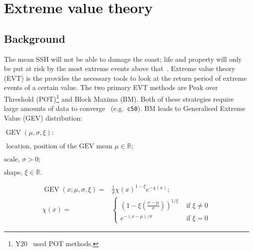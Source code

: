 \newpage
\newpage
[.]
\pagebreak

\section{Extreme value theory}
\label{sec:evt}
\subsection{Background}
The mean SSH will
not be able to damage the coast; life and property will only be put
at risk by the most extreme events above that~\cite{taleb2019statistical, Taleb2012AntifragileH}.
Extreme value theory (EVT) is the provides the necessary tools
to look at the return period of extreme events of a certain value.
The two primary EVT methods are Peak over Threshold
(POT)\footnote{Y20~\cite{ZannaPreprint} used POT methods. } and Block Maxima (BM).
Both of these strategies require
large amounts of data to converge~\cite{taleb2019much} (e.g.~\texttt{c50}).
BM leads to Generalised Extreme Value (GEV) distribution:


    \(
    \operatorname{GEV}(\mu, \sigma, \xi):
    \)

    \(
    \text{ location, position of the GEV mean } \mu \in \mathbb{R};
    \)

    \(
    \text{scale, } \sigma>0;
    \)

    \(
    \text{shape, } \xi \in \mathbb{R}.
    \)

    \iffalse
    \begin{align}
        \chi(x)=&\{
               \begin{array}{ll}
                    \left(1- \xi\left(\frac{x-
                    \mu}{\sigma} \right)\right)^{\frac{1}{\xi}} &
                     \text { if } \xi \neq 0 \\
                    e^{-\frac{x-\mu}{\sigma}} &
                    \text { if } \xi=0 \\

              \end{array}.
    \tag{GEV-2} \label{eq:GEV-2}

    \end{align}
    \fi

\begin{align}
    \operatorname{GEV}(x; \mu, \sigma, \xi)=&
    \frac{1}{\sigma} \chi(x)^{1-\xi} e^{-\chi(x)}; \tag{GEV-1}
    \label{eq:GEV-1}\\
    \chi(x)=&\left\{\begin{array}{ll}
    \left(1-\xi\left(\frac{x-\mu}{\sigma}\right)\right)^{1 / \xi} & \text { if } \xi \neq 0 \\
    e^{-(x-\mu) / \sigma} & \text { if } \xi=0 \tag{GEV-2}
    \end{array}\right.
   \label{eq:GEV-2}
\end{align}


